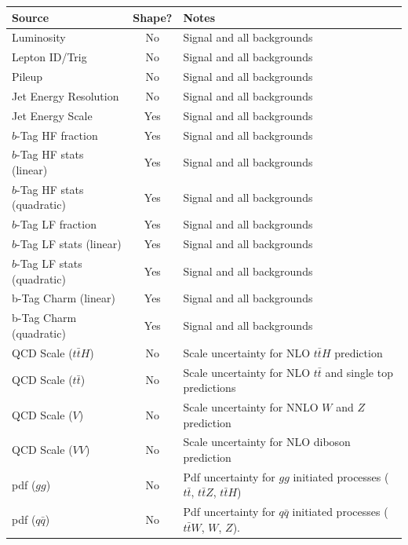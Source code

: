 \begin{table}[hbtp] \small
\centering
\begin{tabular}{lcp{}}
\hline\hline
Source                            & Shape? & Notes \\
\hline
Luminosity                        & No     & Signal and all backgrounds \\
Lepton ID/Trig                    & No     & Signal and all backgrounds \\
Pileup                            & No     & Signal and all backgrounds \\
Jet Energy Resolution             & No     & Signal and all backgrounds \\
Jet Energy Scale                  & Yes    & Signal and all backgrounds \\
$b$-Tag HF fraction               & Yes    & Signal and all backgrounds \\
$b$-Tag HF stats (linear)         & Yes    & Signal and all backgrounds \\
$b$-Tag HF stats (quadratic)      & Yes    & Signal and all backgrounds \\
$b$-Tag LF fraction               & Yes    & Signal and all backgrounds \\
$b$-Tag LF stats (linear)         & Yes    & Signal and all backgrounds \\
$b$-Tag LF stats (quadratic)      & Yes    & Signal and all backgrounds \\
b-Tag Charm (linear)         & Yes    & Signal and all backgrounds \\
b-Tag Charm (quadratic)      & Yes    & Signal and all backgrounds \\
\hline
QCD Scale ($t\bar{t}H$)           & No     & Scale uncertainty for NLO $t\bar{t}H$ prediction \\
QCD Scale ($t\bar{t}$)            & No     & Scale uncertainty for NLO $t\bar{t}$ and single top predictions \\
QCD Scale ($V$)                   & No     & Scale uncertainty for NNLO $W$ and $Z$ prediction \\
QCD Scale ($VV$)                  & No     & Scale uncertainty for NLO diboson prediction \\
\hline
pdf ($gg$)                        & No     & Pdf uncertainty for $gg$ initiated processes ($t\bar{t}$, $t\bar{t}Z$, $t\bar{t}H$) \\
pdf ($q\bar{q}$)                  & No     & Pdf uncertainty for $q\bar{q}$ initiated processes ($t\bar{t}W$, $W$, $Z$). \\

\end{tabular}
\end{table}
